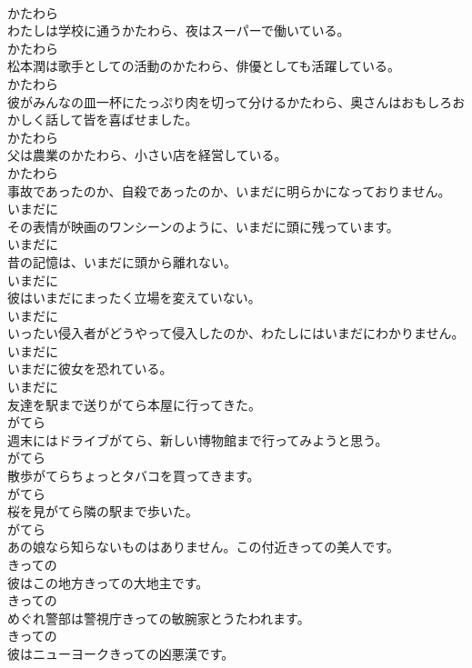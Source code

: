 \documentclass[8pt]{extreport}
\begin{document}
\begin{CJK}{UTF8}{min}
\\	かたわら	
\\	わたしは学校に通うかたわら、夜はスーパーで働いている。	
\\	かたわら	
\\	松本潤は歌手としての活動のかたわら、俳優としても活躍している。	
\\	かたわら	
\\	彼がみんなの皿一杯にたっぷり肉を切って分けるかたわら、奥さんはおもしろおかしく話して皆を喜ばせました。	
\\	かたわら	
\\	父は農業のかたわら、小さい店を経営している。	
\\	かたわら	
\\	事故であったのか、自殺であったのか、いまだに明らかになっておりません。	
\\	いまだに	
\\	その表情が映画のワンシーンのように、いまだに頭に残っています。	
\\	いまだに	
\\	昔の記憶は、いまだに頭から離れない。	
\\	いまだに	
\\	彼はいまだにまったく立場を変えていない。	
\\	いまだに	
\\	いったい侵入者がどうやって侵入したのか、わたしにはいまだにわかりません。	
\\	いまだに	
\\	いまだに彼女を恐れている。	
\\	いまだに	
\\	友達を駅まで送りがてら本屋に行ってきた。	
\\	がてら	
\\	週末にはドライブがてら、新しい博物館まで行ってみようと思う。	
\\	がてら	
\\	散歩がてらちょっとタバコを買ってきます。	
\\	がてら	
\\	桜を見がてら隣の駅まで歩いた。	
\\	がてら	
\\	あの娘なら知らないものはありません。この付近きっての美人です。	
\\	きっての	
\\	彼はこの地方きっての大地主です。	
\\	きっての	
\\	めぐれ警部は警視庁きっての敏腕家とうたわれます。	
\\	きっての	
\\	彼はニューヨークきっての凶悪漢です。	

\end{CJK}
\end{document}
